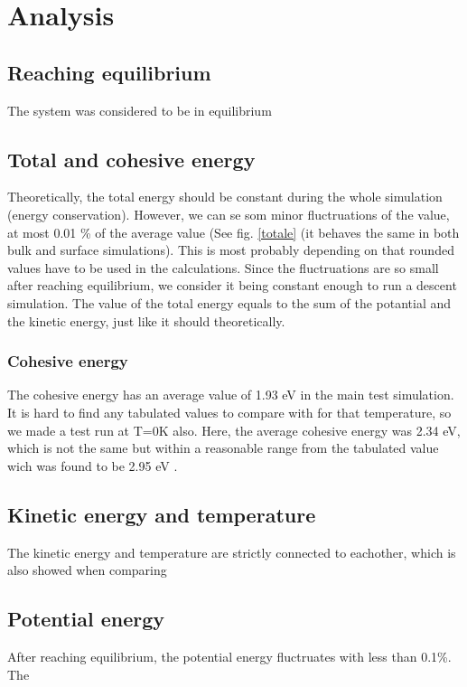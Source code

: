 \section{Analysis}

\subsection{Reaching equilibrium}
The system was considered to be in equilibrium

\subsection{Total and cohesive energy}
Theoretically, the total energy should be constant during the whole simulation (energy conservation). However, we can se som minor fluctruations of the value, at most 0.01 \% of the average value (See fig. \ref{totale} (it behaves the same in both bulk and surface simulations). This is most probably depending on that rounded values have to be used in the calculations. Since the fluctruations are so small after reaching equilibrium, we consider it being constant enough to run a descent simulation. 
The value of the total energy equals to the sum of the potantial and the kinetic energy, just like it should theoretically.
\subsubsection{Cohesive energy}
The cohesive energy has an average value of 1.93 eV in the main test simulation. It is hard to find any tabulated values to compare with for that temperature, so we made a test run at T=0K also. Here, the average cohesive energy was 2.34 eV, which is not the same but within a reasonable range from the tabulated value wich was found to be 2.95 eV \cite{kittel}.

\subsection{Kinetic energy and temperature}
The kinetic energy and temperature are strictly connected to eachother, which is also showed when comparing 

\subsection{Potential energy}
After reaching equilibrium, the potential energy fluctruates with less than 0.1\%. The 

